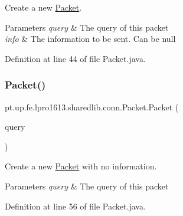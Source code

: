 Create a new \hyperlink{classpt_1_1up_1_1fe_1_1lpro1613_1_1sharedlib_1_1conn_1_1_packet}{Packet}.


\begin{DoxyParams}{Parameters}
{\em query} & The query of this packet \\
\hline
{\em info} & The information to be sent. Can be null \\
\hline
\end{DoxyParams}


Definition at line 44 of file Packet.\+java.

\hypertarget{classpt_1_1up_1_1fe_1_1lpro1613_1_1sharedlib_1_1conn_1_1_packet_a84cf92efe772ec2576fe319cee43effc}{}\label{classpt_1_1up_1_1fe_1_1lpro1613_1_1sharedlib_1_1conn_1_1_packet_a84cf92efe772ec2576fe319cee43effc} 
\subsubsection{\texorpdfstring{Packet()}{Packet()}\hspace{0.1cm}{\footnotesize\ttfamily [2/3]}}
{\footnotesize\ttfamily pt.\+up.\+fe.\+lpro1613.\+sharedlib.\+conn.\+Packet.\+Packet (\begin{DoxyParamCaption}\item[{\hyperlink{enumpt_1_1up_1_1fe_1_1lpro1613_1_1sharedlib_1_1conn_1_1_query}{Query}}]{query }\end{DoxyParamCaption})}

Create a new \hyperlink{classpt_1_1up_1_1fe_1_1lpro1613_1_1sharedlib_1_1conn_1_1_packet}{Packet} with no information.


\begin{DoxyParams}{Parameters}
{\em query} & The query of this packet \\
\hline
\end{DoxyParams}


Definition at line 56 of file Packet.\+java.

\hypertarget{classpt_1_1up_1_1fe_1_1lpro1613_1_1sharedlib_1_1conn_1_1_packet_af3d893f2e45e4ac0e216a2893e36b2b4}{}\label{classpt_1_1up_1_1fe_1_1lpro1613_1_1sharedlib_1_1conn_1_1_packet_af3d893f2e45e4ac0e216a2893e36b2b4} 
